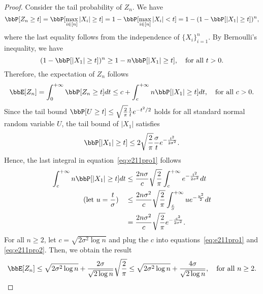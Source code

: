\documentclass[11pt]{article}
\theoremstyle{plain}
\theoremstyle{definition}
\begin{document}
\begin{proof}
	
	\vspace{0.2cm}
	Consider the tail probability of $Z_n$. We have
	\begin{equation}
		\bbP[Z_n \geq t] = \bbP[\max_{i \in [n]} |X_i| \geq t] = 1 - \bbP[\max_{i \in [n]} |X_i| < t] = 1 - (1- \bbP[|X_1| \geq t])^n,
	\end{equation}
	where the last equality follows from the independence of $\{X_i\}_{i=1}^n$. By Bernoulli's inequality, we have
	\begin{equation}
		(1- \bbP[|X_1| \geq t])^n \geq 1 - n \bbP[|X_1| \geq t], \quad \text{for all } t >0.
	\end{equation} 
	Therefore, the expectation of $Z_n$ follows
	\begin{equation}\label{eq:e211pro1}
		\bbE[Z_n] = \int_{0}^{+\infty} \bbP[Z_n \geq t] dt \leq  c +  \int_{c}^{+\infty} n\bbP[|X_1| \geq t] dt, \quad \text{for all } c > 0.
	\end{equation}
	 Since the tail bound $\bbP[U \geq t] \leq \sqrt{\frac{2}{\pi}} \frac{1}{t} e^{-t^2 /2}$ holds for all standard normal random variable $U$, the tail bound of $|X_1|$ satisfies
	 \begin{equation}\label{eq:e211proupper}
	 	\bbP[|X_1| \geq t] \leq 2 \sqrt{\frac{2}{\pi}} \frac{\sigma}{t} e^{-\frac{t^2}{2\sigma^2}}.
	 \end{equation}
	 Hence, the last integral in equation~\eqref{eq:e211pro1} follows
	 \begin{align}
	 	 \int_{c}^{+\infty} n\bbP[|X_1| \geq t] dt &\leq \frac{2n \sigma}{c} \sqrt{\frac{2}{\pi}} \int_{c}^{+\infty} e^{-\frac{t^2}{2\sigma^2} }dt \\ (\text{let } u = \frac{ t}{\sigma}) \quad  
	 	 & \leq \frac{2n \sigma^2}{c} \sqrt{\frac{2}{\pi}}   \int_{\frac{c}{\sigma}}^{+\infty} u e^{-\frac{u^2}{2}} dt \\
	 	 & = \frac{2n \sigma^2}{c} \sqrt{\frac{2}{\pi}}  e^{-\frac{c^2}{2\sigma^2}}. \label{eq:e211pro2}
	 \end{align}
	 For all $n \geq 2$, let $c = \sqrt{2\sigma^2 \log n}$ and plug the $c$ into equations~\eqref{eq:e211pro1} and \eqref{eq:e211pro2}. Then, we obtain the result
	 \begin{equation}
	 	\bbE[Z_n] \leq \sqrt{2\sigma^2 \log n} + \frac{2\sigma}{\sqrt{2\log n}}   \sqrt{\frac{2}{\pi}}  \leq \sqrt{2\sigma^2 \log n} + \frac{4\sigma}{\sqrt{2\log n}}, \quad \text{for all }n \geq 2.
	 \end{equation}
	 

\end{proof}
\end{document}
